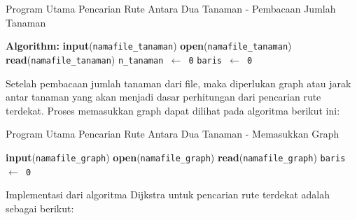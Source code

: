 \documentclass[conference]{IEEEtran}
\begin{document}
\begin{algorithm}
    \caption{Program Utama Pencarian Rute Antara Dua Tanaman - Pembacaan Jumlah Tanaman}\label{alg:four}
    \DontPrintSemicolon
    \textbf{Algorithm:}\;
    \textbf{input}(\texttt{namafile\_tanaman})\;
    \textbf{open}(\texttt{namafile\_tanaman})\;
    \textbf{read}(\texttt{namafile\_tanaman})\;
    \texttt{n\_tanaman $\gets$ 0}\;
    \texttt{baris $\gets$ 0}\;
\end{algorithm}
\vspace{-0.6 cm}
Setelah pembacaan jumlah tanaman dari file, maka diperlukan graph atau jarak antar tanaman yang akan menjadi dasar
perhitungan dari pencarian rute terdekat. Proses memasukkan
graph dapat dilihat pada algoritma berikut ini:
\vspace{-0.5 cm}
\begin{algorithm}
    \caption{Program Utama Pencarian Rute Antara Dua Tanaman - Memasukkan Graph}\label{alg:five}
    \DontPrintSemicolon
    \textbf{input}(\texttt{namafile\_graph})\;
    \textbf{open}(\texttt{namafile\_graph})\;
    \textbf{read}(\texttt{namafile\_graph})\;
    \texttt{baris $\gets$ 0}\;
\end{algorithm}

Implementasi dari algoritma Dijkstra untuk pencarian rute terdekat adalah
sebagai berikut:
\end{document}
